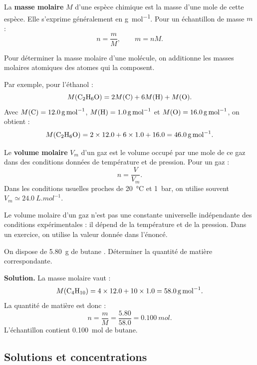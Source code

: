 \documentclass[11pt,a4paper]{article}
\begin{document}
\begin{definitionbox}
La \textbf{masse molaire} $M$ d'une espèce chimique est la masse d'une mole de cette espèce. Elle s'exprime généralement en \si{g.mol^{-1}}. Pour un échantillon de masse $m$ :
\[
n=\frac{m}{M}, \qquad m=nM.
\]
\end{definitionbox}

\begin{methodbox}
Pour déterminer la masse molaire d'une molécule, on additionne les masses molaires atomiques des atomes qui la composent.

Par exemple, pour l'éthanol  :
\[
M(\ce{C2H6O})=2M(\ce C)+6M(\ce H)+M(\ce O).
\]
Avec $M(\ce C)=\SI{12.0}{g.mol^{-1}}$, $M(\ce H)=\SI{1.0}{g.mol^{-1}}$ et $M(\ce O)=\SI{16.0}{g.mol^{-1}}$, on obtient :
\[
M(\ce{C2H6O})=2\times12.0+6\times1.0+16.0=\SI{46.0}{g.mol^{-1}}.
\]
\end{methodbox}

\begin{definitionbox}
Le \textbf{volume molaire} $V_m$ d'un gaz est le volume occupé par une mole de ce gaz dans des conditions données de température et de pression. Pour un gaz :
\[
n=\frac{V}{V_m}.
\]
Dans les conditions usuelles proches de \SI{20}{\degreeCelsius} et \SI{1}{bar}, on utilise souvent $V_m\simeq\SI{24.0}{L.mol^{-1}}$.
\end{definitionbox}

\begin{erreurbox}
Le volume molaire d'un gaz n'est pas une constante universelle indépendante des conditions expérimentales : il dépend de la température et de la pression. Dans un exercice, on utilise la valeur donnée dans l'énoncé.
\end{erreurbox}

\begin{exemplebox}
On dispose de \SI{5.80}{g} de butane . Déterminer la quantité de matière correspondante.

\textbf{Solution.} La masse molaire vaut :
\[
M(\ce{C4H10})=4\times12.0+10\times1.0=\SI{58.0}{g.mol^{-1}}.
\]
La quantité de matière est donc :
\[
n=\frac{m}{M}=\frac{5.80}{58.0}=\SI{0.100}{mol}.
\]
L'échantillon contient \SI{0.100}{mol} de butane.
\end{exemplebox}

\subsection{Solutions et concentrations}
\end{document}
